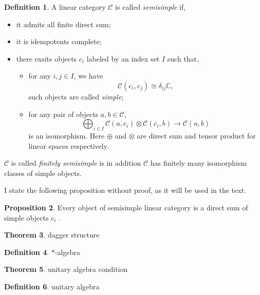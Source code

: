 \documentclass[a4paper,11pt]{article}
\theoremstyle{definition}
\newtheorem{definition}{Definition}[section]
\newtheorem{theorem}[definition]{Theorem}
\newtheorem{proposition}[definition]{Proposition}
\begin{document}
\begin{definition}
    A linear category $\mathcal{C}$  is called \textit{semisimple} if,
    \begin{itemize}
    \item it admits all finite direct sum;
    \item it is idempotents complete;
    \item there exsits objects $c_i$ labeled by an index set $I$ such that,
    \begin{itemize}
        \item for any $i,j\in I$, we have
        \begin{equation}
            \mathcal{C}(c_i,c_j)\cong \delta_{ij}\mathbb{C},
        \end{equation}
        such objects are called \textit{simple};
        \item for any pair of objects $a,b\in \mathcal{C}$,
        \begin{equation}
            \bigoplus_{i\in I}\mathcal{C}(a,c_i)\otimes \mathcal{C}(c_i,b)\to \mathcal{C}(a,b)
        \end{equation}
        is an isomorphism. Here $\oplus$ and $\otimes$ are direct sum and tensor product for linear spaces respectively. 
    \end{itemize}  
    \end{itemize}
    $\mathcal{C}$ is called \textit{finitely semisimple} is in addition $\mathcal{C}$ has finitely many isomorphism classes of simple objects. 
\end{definition}
I state the following proposition without proof, as it will be used in the text.
\begin{proposition}
    Every object of semisimple linear category is a direct sum of simple objects $c_i$ .
\end{proposition}
\begin{theorem}
    dagger structure
\end{theorem}
\begin{definition}
    $*$-algebra
\end{definition}
\begin{theorem}
    unitary algebra condition
\end{theorem}
\begin{definition}
    unitary algebra
\end{definition}





\end{document}
